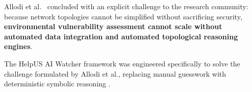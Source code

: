 Allodi et al.~\cite{santos2017estimating} concluded with an explicit challenge to the research community: because network topologies cannot be simplified without sacrificing security, \textbf{environmental vulnerability assessment cannot scale without automated data integration and automated topological reasoning engines}. 

The HelpUS AI Watcher framework was engineered specifically to solve the challenge formulated by Allodi et al., replacing manual guesswork with deterministic symbolic reasoning .

